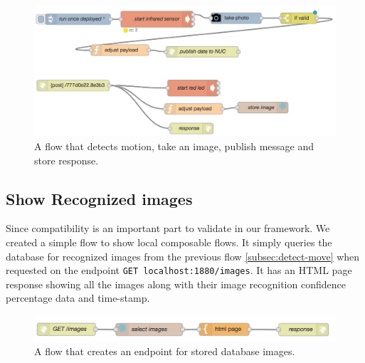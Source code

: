 \begin{figure}[H]
	\centering
	\includegraphics[scale=0.6]{images/flow-motion.png}
	\caption{A flow that detects motion, take an image, publish message and store response.}
	\label{fig:flow-motion}
\end{figure}


\subsection{Show Recognized images}\label{subsec:images}
Since compatibility is an important part to validate in our framework. We created a simple flow to show local composable flows. It simply queries the database for recognized images from the previous flow \ref{subsec:detect-move} when requested on the endpoint \verb|GET localhost:1880/images|. It has an HTML page response showing all the images along with their image recognition confidence percentage data and time-stamp.

\begin{figure}[H]
	\centering
	\includegraphics[scale=0.6]{images/flow-images.png}
	\caption{A flow that creates an endpoint for stored database images.}
	\label{fig:flow-image}
\end{figure}

